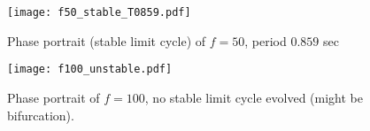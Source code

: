 \begin{figure}[H]
\centering
\texttt{[image: f50\_stable\_T0859.pdf]} 
\caption{Phase portrait (stable limit cycle) of $f = 50$, period $0.859$ sec}
\end{figure}

\begin{figure}[H]
\centering
\texttt{[image: f100\_unstable.pdf]} 
\caption{Phase portrait of $f = 100$, no stable limit cycle evolved (might be bifurcation).}
\end{figure}

\pagebreak